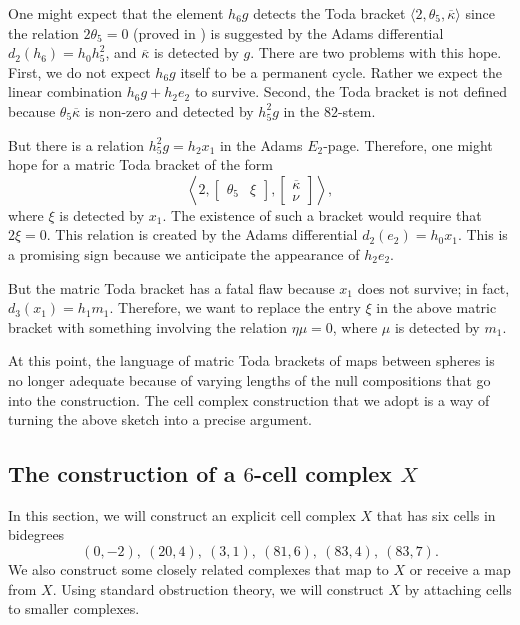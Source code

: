 \documentclass{amsart}
\theoremstyle{definition}
\newcommand{\kappabar}{\overline{\kappa}}
\begin{document}
One might expect that the element $h_6 g$ detects
the Toda bracket $\langle 2, \theta_5, \kappabar \rangle$
since the relation $2\theta_5 = 0$ (proved in \cite{Xu16}) is suggested by the
Adams differential $d_2(h_6) = h_0 h_5^2$,
and $\kappabar$ is detected by $g$.
There are two problems with this hope.  First,
we do not expect $h_6 g$ itself to be a permanent cycle.
Rather we expect the linear combination
$h_6 g + h_2 e_2$ to survive.  Second,
the Toda bracket is not defined because
$\theta_5 \kappabar$ is non-zero and detected by 
$h_5^2 g$ in the $82$-stem.

But there is a relation $h_5^2 g = h_2 x_1$ in the Adams $E_2$-page.
Therefore, one might hope for a matric Toda bracket of the form
\[
\left\langle
2, 
\left[ \begin{array}{cc} \theta_5 & \xi \end{array} \right],
\left[ \begin{array}{c} \kappabar \\ \nu \end{array} \right]
\right\rangle,
\]
where $\xi$ is detected by $x_1$.  
The existence of such a bracket would require that
$2 \xi = 0$.  This relation is created by the Adams differential
$d_2(e_2) = h_0 x_1$.  This is a promising sign because we anticipate
the appearance of $h_2 e_2$.

But the matric Toda bracket has a fatal flaw
because $x_1$ does not survive; in fact, $d_3(x_1) = h_1 m_1$.
Therefore, we want to replace the entry
$\xi$ in the above matric bracket with something involving
the relation $\eta \mu = 0$, where $\mu$ is detected by $m_1$.

At this point, the language of matric Toda brackets 
of maps between spheres
is no longer
adequate because of varying
lengths of the null compositions that go into the construction.
The cell complex construction that we adopt is a way of turning
the above sketch into a precise argument.

\subsection{The construction of a $6$-cell complex $X$}
\label{subsctn:complex}

In this section, we will construct an explicit cell complex $X$
that has six cells in bidegrees
\[
(0,-2), \ (20,4), \ (3, 1), \ (81, 6), \ (83, 4), \ (83, 7).
\]
We also construct some closely related complexes that
map to $X$ or receive a map from $X$.
Using standard obstruction theory, we will construct $X$ 
by attaching cells to smaller complexes.
\end{document}
